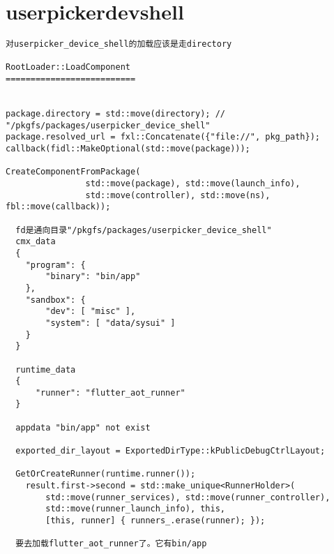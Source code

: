 \section{userpickerdevshell}


\begin{verbatim}
对userpicker_device_shell的加载应该是走directory

RootLoader::LoadComponent
==========================


package.directory = std::move(directory); // "/pkgfs/packages/userpicker_device_shell"
package.resolved_url = fxl::Concatenate({"file://", pkg_path});
callback(fidl::MakeOptional(std::move(package)));

CreateComponentFromPackage(
                std::move(package), std::move(launch_info),
                std::move(controller), std::move(ns), fbl::move(callback));

  fd是通向目录"/pkgfs/packages/userpicker_device_shell"
  cmx_data 
  {
    "program": {
        "binary": "bin/app"
    },
    "sandbox": {
        "dev": [ "misc" ],
        "system": [ "data/sysui" ]
    }
  }

  runtime_data
  {
      "runner": "flutter_aot_runner"
  }

  appdata "bin/app" not exist

  exported_dir_layout = ExportedDirType::kPublicDebugCtrlLayout;

  GetOrCreateRunner(runtime.runner());
    result.first->second = std::make_unique<RunnerHolder>(
        std::move(runner_services), std::move(runner_controller),
        std::move(runner_launch_info), this,
        [this, runner] { runners_.erase(runner); });

  要去加载flutter_aot_runner了。它有bin/app
\end{verbatim}